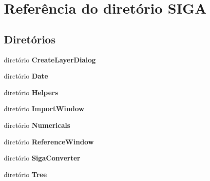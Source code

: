 \section{Referência do diretório S\+I\+GA}
\label{dir_df449b5dc3d8a95b490a473885c95217}
\subsection*{Diretórios}
\begin{DoxyCompactItemize}
\item 
diretório {\bf Create\+Layer\+Dialog}
\item 
diretório {\bf Date}
\item 
diretório {\bf Helpers}
\item 
diretório {\bf Import\+Window}
\item 
diretório {\bf Numericals}
\item 
diretório {\bf Reference\+Window}
\item 
diretório {\bf Siga\+Converter}
\item 
diretório {\bf Tree}
\end{DoxyCompactItemize}
